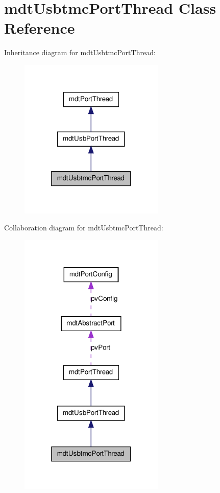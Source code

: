 \hypertarget{classmdt_usbtmc_port_thread}{
\section{mdtUsbtmcPortThread Class Reference}
\label{classmdt_usbtmc_port_thread}
}


Inheritance diagram for mdtUsbtmcPortThread:\nopagebreak
\begin{figure}[H]
\begin{center}
\leavevmode
\includegraphics[width=196pt]{classmdt_usbtmc_port_thread__inherit__graph}
\end{center}
\end{figure}


Collaboration diagram for mdtUsbtmcPortThread:\nopagebreak
\begin{figure}[H]
\begin{center}
\leavevmode
\includegraphics[width=196pt]{classmdt_usbtmc_port_thread__coll__graph}
\end{center}
\end{figure}
